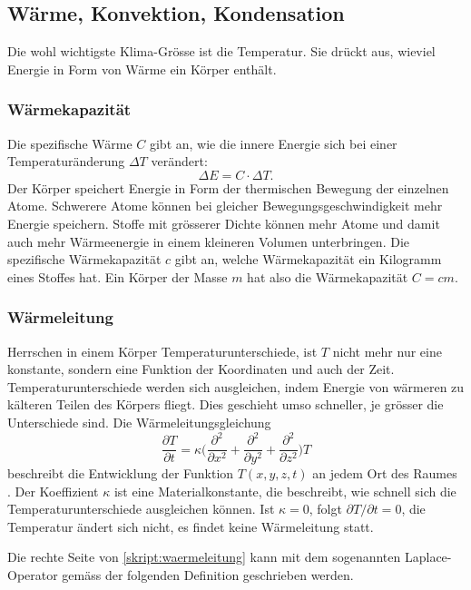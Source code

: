 \subsection{Wärme, Konvektion, Kondensation}
Die wohl wichtigste Klima-Grösse ist die Temperatur.
Sie drückt aus, wieviel Energie in Form von Wärme ein Körper enthält.

\subsubsection{Wärmekapazität}
Die spezifische Wärme $C$ gibt an, wie die innere Energie sich bei
einer Temperaturänderung $\Delta T$ verändert:
\[
\Delta E = C\cdot\Delta T.
\]
Der Körper speichert Energie in Form der thermischen Bewegung der
einzelnen Atome.
Schwerere Atome können bei gleicher Bewegungsgeschwindigkeit 
mehr Energie speichern.
Stoffe mit grösserer Dichte können mehr Atome und damit auch mehr
Wärmeenergie in einem kleineren Volumen unterbringen.
Die spezifische Wärmekapazität $c$ gibt an, welche Wärmekapazität
ein Kilogramm eines Stoffes hat.
Ein Körper der Masse $m$ hat also die Wärmekapazität $C=cm$.

\subsubsection{Wärmeleitung}
Herrschen in einem Körper Temperaturunterschiede, ist $T$ nicht mehr
nur eine konstante, sondern eine Funktion der Koordinaten und auch der
Zeit.
Temperaturunterschiede werden sich ausgleichen, indem Energie von
wärmeren zu kälteren Teilen des Körpers fliegt.
Dies geschieht umso schneller, je grösser die Unterschiede sind.
Die Wärmeleitungsgleichung
\begin{equation}
\frac{\partial T}{\partial t}
=
\kappa
\biggl(
\frac{\partial^2}{\partial x^2}
+
\frac{\partial^2}{\partial y^2}
+
\frac{\partial^2}{\partial z^2}
\biggr)
T
\label{skript:waermeleitung}
\end{equation}
beschreibt die Entwicklung der Funktion $T(x,y,z,t)$ an jedem
Ort des Raumes \cite{skript:waermeleitung}.
Der Koeffizient $\kappa$ ist eine Materialkonstante, die beschreibt,
wie schnell sich die Temperaturunterschiede ausgleichen können.
Ist $\kappa=0$, folgt $\partial T/\partial t=0$, die Temperatur 
ändert sich nicht, es findet keine Wärmeleitung statt.

Die rechte Seite von \eqref{skript:waermeleitung} kann mit dem
sogenannten Laplace-Operator gemäss der folgenden Definition 
geschrieben werden.


